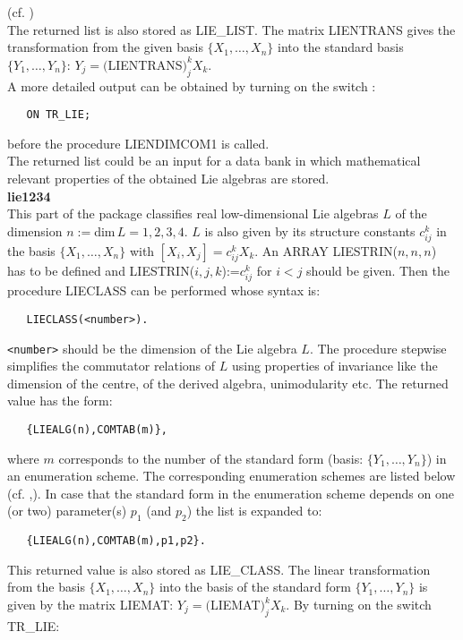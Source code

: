 (cf. \cite{cssmp92})\\[0.2cm]
The returned list is also stored as LIE\_LIST. The matrix LIENTRANS gives the
transformation from the given basis $\{X_1,\ldots ,X_n\}$ into the standard
basis $\{Y_1,\ldots ,Y_n\}$: $Y_j=($LIENTRANS$)_j^k X_k$.\\[0.1cm]
A more detailed output can be obtained by turning on the switch :
\begin{verbatim}
   ON TR_LIE;
\end{verbatim}
before the procedure LIENDIMCOM1 is called.\\[0.1cm]
The returned list could be an input for a data bank in which mathematical
relevant properties of the obtained Lie algebras are stored.\\[0.3cm]
{\large\bf lie1234}\\[0.1cm]
This part of the package classifies real low-dimensional Lie algebras $L$
of the dimension
$n:=$dim$\,L=1,2,3,4$. $L$ is also given by its structure constants $c_{ij}^k$
in the basis $\{X_1,\ldots,X_n\}$ with $[X_i,X_j]=c_{ij}^k X_k$. An ARRAY
LIESTRIN($n,n,n$) has to be defined and LIESTRIN($i,j,k$):=$c_{ij}^k$ for
$i<j$ should be given. Then the procedure LIECLASS can be performed
whose syntax is:
\begin{verbatim}
   LIECLASS(<number>).
\end{verbatim}
{\tt <number>} should be the dimension of the Lie algebra $L$. The procedure
stepwise simplifies the commutator relations of $L$ using properties of
invariance like the dimension of the centre, of the derived algebra,
unimodularity etc.  The returned value has the form:
\begin{verbatim}
   {LIEALG(n),COMTAB(m)},
\end{verbatim}
where $m$ corresponds to the number of the standard form (basis:
$\{Y_1,\ldots,Y_n\}$) in an enumeration scheme. The corresponding enumeration
schemes are listed below (cf. \cite{ntz-preprint27/92},\cite{mmpreprint1979}).
In case that the standard form in the enumeration scheme depends on one (or two)
parameter(s) $p_1$ (and $p_2$) the list is expanded to:
\begin{verbatim}
   {LIEALG(n),COMTAB(m),p1,p2}.
\end{verbatim}
This returned value is also stored as LIE\_CLASS. The linear transformation from
the basis $\{X_1,\ldots,X_n\}$ into the basis of the standard form
$\{Y_1,\ldots,Y_n\}$ is given by the matrix LIEMAT:
$Y_j=($LIEMAT$)_j^k X_k$.\newpage
By turning on the switch TR\_LIE:
